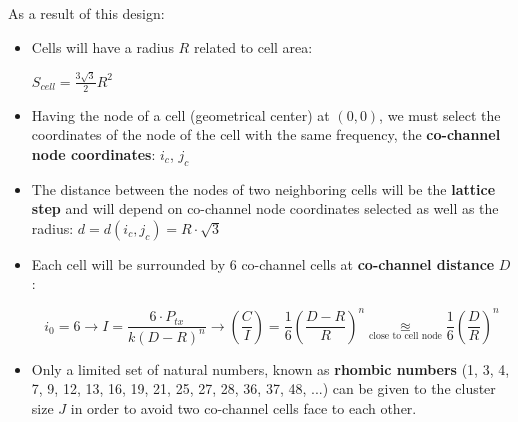 \documentclass[../main.tex]{subfiles}
\begin{document}
As a result of this design:
\begin{itemize}
	\item {
		Cells will have a radius $R$ related to cell area:

		$S_{cell} = \frac {3 \sqrt{3}}{2} R^2$
	}
	\item Having the node of a cell (geometrical center) at $(0, 0)$, we must select the coordinates of the node of the cell with the same frequency, the \textbf{co-channel node coordinates}: $i_c$, $j_c$
	\item The distance between the nodes of two neighboring cells will be the \textbf{lattice step} and will depend on co-channel node coordinates selected as well as the radius: $d = d(i_c, j_c) = R \cdot \sqrt{3}$
	\item {
		Each cell will be surrounded by 6 co-channel cells at \textbf{co-channel distance} $D$:

		$$
			i_0 = 6 \rightarrow I = \frac {6 \cdot P_{tx}} {k (D - R)^n} \rightarrow \left( \frac{C}{I} \right) = \frac{1}{6} \left( \frac {D - R} {R} \right)^n \underset{\text{close to cell node}}{\approxeq} \frac{1}{6} \left( \frac {D} {R} \right)^n
		$$
	}
	\item Only a limited set of natural numbers, known as \textbf{rhombic numbers} (1, 3, 4, 7, 9, 12, 13, 16, 19, 21, 25, 27, 28, 36, 37, 48, ...) can be given to the cluster size $J$ in order to avoid two co-channel cells face to each other.

\end{itemize}
\end{document}
